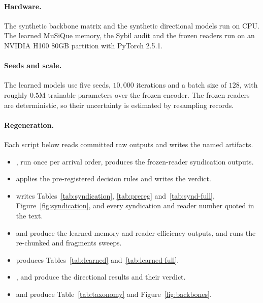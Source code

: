 \documentclass{article}
\begin{document}
\paragraph{Hardware.} The synthetic backbone matrix and the synthetic
directional models run on CPU. The learned MuSiQue memory, the Sybil audit and
the frozen readers run on an NVIDIA H100 80GB partition with PyTorch 2.5.1.

\paragraph{Seeds and scale.} The learned models use five seeds, $10{,}000$
iterations and a batch size of $128$, with roughly $0.5$M trainable parameters
over the frozen encoder. The frozen readers are deterministic, so their
uncertainty is estimated by resampling records.

\paragraph{Regeneration.} Each script below reads committed raw outputs and
writes the named artifacts.
\begin{itemize}\setlength{\itemsep}{0pt}\raggedright
\item {}, run once per arrival
order, produces the frozen-reader syndication outputs.
\item {} applies the pre-registered
decision rules and writes the verdict.
\item {} writes Tables~\ref{tab:syndication},
\ref{tab:prereg} and~\ref{tab:synd-full}, Figure~\ref{fig:syndication}, and
every syndication and reader number quoted in the text.
\item {} and
 produce the learned-memory and
reader-efficiency outputs, and  runs the
re-chunked and fragments sweeps.
\item {} produces
Tables~\ref{tab:learned} and~\ref{tab:learned-full}.
\item {},
 and
 produce the directional results and
their verdict.
\item {} and
 produce Table~\ref{tab:taxonomy} and
Figure~\ref{fig:backbones}.
\end{itemize}
\end{document}
